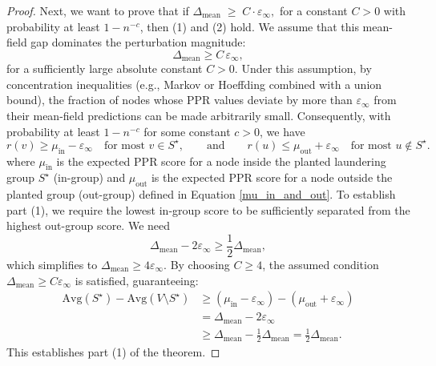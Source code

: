 \begin{proof}
\vspace{3mm}
\noindent Next, we want to prove that if $\Delta_{\mathrm{mean}} \;\ge\; C\cdot\varepsilon_{\infty},$ for a constant $C>0$ with probability at least $1-n^{-c}$, then (1) and (2) hold. 
We assume that this mean-field gap dominates the perturbation magnitude:
\[
\Delta_{\mathrm{mean}} \ge C\,\varepsilon_{\infty},
\]
for a sufficiently large absolute constant $C>0$.
Under this assumption, by concentration inequalities (e.g., Markov or Hoeffding combined with a union bound),
the fraction of nodes whose PPR values deviate by more than $\varepsilon_{\infty}$ from their mean-field predictions
can be made arbitrarily small.
Consequently, with probability at least $1 - n^{-c}$ for some constant $c>0$, we have
\[
r(v) \ge \mu_{\mathrm{in}} - \varepsilon_{\infty}
\quad \text{for most } v \in S^\star,
\qquad\text{and}\qquad
r(u) \le \mu_{\mathrm{out}} + \varepsilon_{\infty}
\quad \text{for most } u \notin S^\star.
\]
where $\mu_{\mathrm{in}}$ is the expected PPR score for a node inside the planted laundering group $S^\star$ (in-group) and $\mu_{\mathrm{out}}$ is the expected PPR score for a node outside the planted group (out-group) defined in Equation \ref{mu_in_and_out}.
To establish part (1), we require the lowest in-group score to be sufficiently separated from the highest out-group score. We need
\[
\Delta_{\mathrm{mean}} - 2\varepsilon_{\infty} \ge \frac{1}{2}\Delta_{\mathrm{mean}},
\]
which simplifies to $\Delta_{\mathrm{mean}} \ge 4\varepsilon_{\infty}$.
By choosing $C \ge 4$, the assumed condition $\Delta_{\mathrm{mean}} \ge C \varepsilon_{\infty}$ is satisfied, guaranteeing:
\begin{align*}
\text{Avg}(S^\star) - \text{Avg}(V \setminus S^\star) &\ge (\mu_{\mathrm{in}} - \varepsilon_{\infty}) - (\mu_{\mathrm{out}} + \varepsilon_{\infty}) \\
&= \Delta_{\mathrm{mean}} - 2\varepsilon_{\infty} \\
&\ge \Delta_{\mathrm{mean}} - \frac{1}{2}\Delta_{\mathrm{mean}} = \frac{1}{2}\Delta_{\mathrm{mean}}.
\end{align*}
This establishes part (1) of the theorem.



\end{proof}
